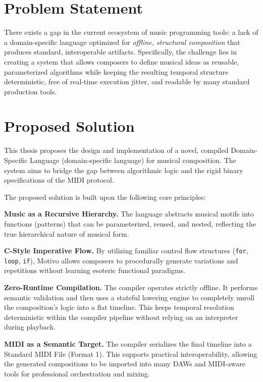 \section{Problem Statement}\label{detail-sec:problem-statement}

There exists a gap in the current ecosystem of music programming tools: a lack of a domain-specific language optimized
for \textit{offline, structural composition} that produces standard, interoperable artifacts.
Specifically, the challenge lies in creating a system that allows composers to define musical ideas as reusable,
parameterized algorithms while keeping the resulting temporal structure deterministic, free of real-time
execution jitter,
and readable by many standard production tools.

\section{Proposed Solution}\label{detail-sec:proposed-solution}

This thesis proposes the design and implementation of a novel, compiled Domain-Specific Language
(domain-specific language) for musical
composition.
The system aims to bridge the gap between algorithmic logic and the rigid binary specifications of the MIDI protocol.

The proposed solution is built upon the following core principles:

\noindent \textbf{Music as a Recursive Hierarchy.} The language abstracts musical motifs into functions (patterns) that
can be parameterized, reused, and nested, reflecting the true hierarchical nature of musical form.

\noindent \textbf{C-Style Imperative Flow.} By utilizing familiar control flow structures (\texttt{for}, \texttt{loop},
\texttt{if}), Motivo allows composers to procedurally generate variations and repetitions without learning esoteric
functional paradigms.

\noindent \textbf{Zero-Runtime Compilation.} The compiler operates strictly offline.
It performs semantic validation and then uses a stateful lowering engine to completely unroll the composition's
logic into a flat timeline.
This keeps temporal resolution deterministic within the compiler pipeline without relying on an interpreter
during playback.

\noindent \textbf{MIDI as a Semantic Target.} The compiler serializes the final timeline into a Standard MIDI File
(Format 1).
This supports practical interoperability, allowing the generated compositions to be imported into many DAWs
and MIDI-aware tools for
professional orchestration and mixing.

